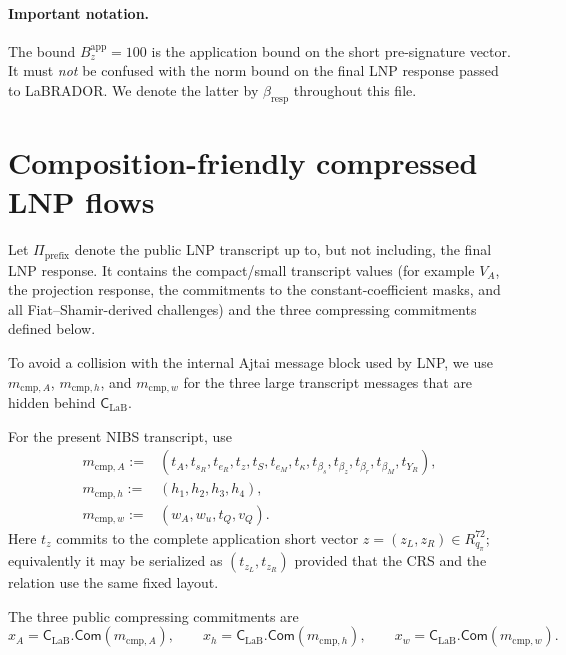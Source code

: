 \documentclass[11pt]{article}
\newcommand{\Com}{\mathsf{Com}}
\newcommand{\CLaB}{\mathsf C_{\mathrm{LaB}}}
\begin{document}
\paragraph{Important notation.}
The bound $B_z^{\mathrm{app}}=100$ is the application bound on the short
pre-signature vector.  It must \emph{not} be confused with the norm bound on
the final LNP response passed to LaBRADOR.  We denote the latter by
$\beta_{\mathrm{resp}}$ throughout this file.

\section{Composition-friendly compressed LNP flows}

Let $\Pi_{\mathrm{prefix}}$ denote the public LNP transcript up to, but not
including, the final LNP response.  It contains the compact/small transcript
values (for example $V_A$, the projection response, the commitments to the
constant-coefficient masks, and all Fiat--Shamir-derived challenges) and the
three compressing commitments defined below.

To avoid a collision with the internal Ajtai message block used by LNP, we use
$m_{\mathrm{cmp},A}$, $m_{\mathrm{cmp},h}$, and $m_{\mathrm{cmp},w}$ for the
three large transcript messages that are hidden behind $\CLaB$.

For the present NIBS transcript, use
\begin{align}
 m_{\mathrm{cmp},A}:={}&(
 t_A,t_{s_R},t_{e_R},t_z,t_S,t_{e_M},t_\kappa,
 t_{\beta_s},t_{\beta_z},t_{\beta_r},t_{\beta_M},t_{Y_R}),
 \label{eq:mcmpA}\\
 m_{\mathrm{cmp},h}:={}&(h_1,h_2,h_3,h_4),
 \label{eq:mcmph}\\
 m_{\mathrm{cmp},w}:={}&(w_A,w_u,t_Q,v_Q).
 \label{eq:mcmpw}
\end{align}
Here $t_z$ commits to the complete application short vector
$z=(z_L,z_R)\in R_{q_\pi}^{72}$; equivalently it may be serialized as
$(t_{z_L},t_{z_R})$ provided that the CRS and the relation use the same fixed
layout.

The three public compressing commitments are
\begin{equation}
 \boxed{
 x_A=\CLaB.\Com(m_{\mathrm{cmp},A}),\qquad
 x_h=\CLaB.\Com(m_{\mathrm{cmp},h}),\qquad
 x_w=\CLaB.\Com(m_{\mathrm{cmp},w}).
 }
 \label{eq:three-commitments}
\end{equation}
\end{document}

